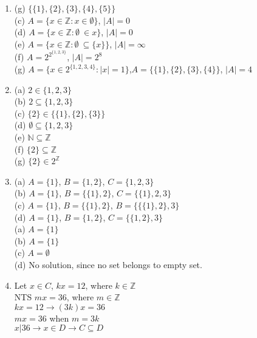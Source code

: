 \documentclass[12pt]{article}
\begin{document}
\begin{enumerate}
\item
{}(g) $\{\{1\},\{2\},\{3\},\{4\},\{5\}\}$\\
(c) $A=\{ x \in \mathbb{Z}: x \in \emptyset\}$, \;  $|A|=0$\\
(d) $A=\{ x \in \mathbb{Z}: \emptyset\ \in x\}$,\; $|A|=0$\\
(e) $A=\{ x \in \mathbb{Z}: \emptyset\ \subseteq \{x\}\}$,\; $|A|=\infty$\\
(f) $A=2^{2^{\{1,2,3\}}}$,\; $|A|=2^{8}$\\
(g) $A=\{ x \in 2^{\{1,2,3,4\}}: |x|=1\}$,\;$A=\{\{1\},\{2\},\{3\},\{4\}\}$,\; $|A|=4$\\

\item
{}(a) $2 \in \{1,2,3\}$\\
(b) ${2} \subseteq \{1,2,3\}$\\
(c) $\{2\} \in \{\{1\},\{2\},\{3\}\}$\\
(d) $\emptyset \subseteq \{1,2,3\}$\\
(e) $\mathbb{N} \subseteq \mathbb{Z}$\\
(f) $\{2\} \subseteq \mathbb{Z}$\\
(g) $\{2\} \in 2^{\mathbb{Z}}$\\

\item
{}(a) $A=\{1\}$, $B=\{1,2\}$, $C=\{1,2,3\}$\\
(b) $A=\{1\}$, $B=\{\{1\},2\}$, $C=\{\{1\},2,3\}$\\
(c) $A=\{1\}$, $B=\{\{1\},2\}$, $B=\{\{\{1\},2\},3\}$\\
(d) $A=\{1\}$, $B=\{1,2\}$,  $C=\{\{1,2\},3\}$\\
(a) $A=\{1\}$\\
(b) $A=\{1\}$\\
(c) $A=\emptyset$\\
(d) No solution, since no set belongs to empty set.\\

\item
{} Let $x \in C$, $kx = 12$, where $k \in \mathbb{Z}$\\
NTS $mx=36$, where $m \in \mathbb{Z}$\\
$kx=12 \to (3k)x=36$\\
$mx=36$ when $m=3k$\\
$x|36 \to x \in D \to C \subseteq D$\\


\end{enumerate}
\end{document}

